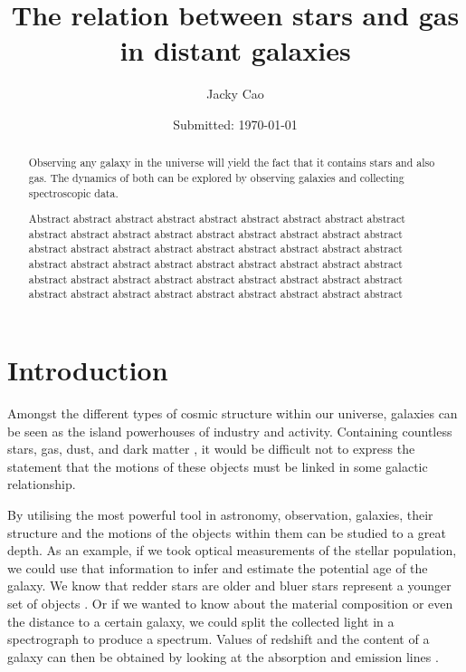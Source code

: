\documentclass[12pt, twocolumn]{revtex4}    %
\begin{document}
                     


\title{The relation between stars and gas in distant galaxies} 
\date{Submitted: \today{}}
\author{Jacky Cao}

\begin{abstract}              
 
 Observing any galaxy in the universe will yield the fact that it contains stars and also gas. The dynamics of both can be explored by observing galaxies and collecting spectroscopic data. 
 
Abstract abstract abstract abstract abstract abstract abstract abstract abstract abstract abstract abstract abstract abstract abstract abstract abstract abstract abstract abstract abstract abstract abstract abstract abstract abstract abstract abstract abstract abstract abstract abstract abstract abstract abstract abstract abstract abstract abstract abstract abstract abstract abstract abstract abstract abstract abstract abstract abstract abstract abstract abstract abstract abstract 

\end{abstract}

\maketitle

\tableofcontents

\newpage

\section{Introduction} 

Amongst the different types of cosmic structure within our universe, galaxies can be seen as the island powerhouses of industry and activity. Containing countless stars, gas, dust, and dark matter \cite{carroll_astro}, it would be difficult not to express the statement that the motions of these objects must be linked in some galactic relationship. 

By utilising the most powerful tool in astronomy, observation, galaxies, their structure and the motions of the objects within them can be studied to a great depth. As an example, if we took optical measurements of the stellar population, we could use that information to infer and estimate the potential age of the galaxy. We know that redder stars are older and bluer stars represent a younger set of objects \cite{carroll_astro}. Or if we wanted to know about the material composition or even the distance to a certain galaxy, we could split the collected light in a spectrograph to produce a spectrum. Values of redshift and the content of a galaxy can then be obtained by looking at the absorption and emission lines \cite{carroll_astro}.
\end{document}

